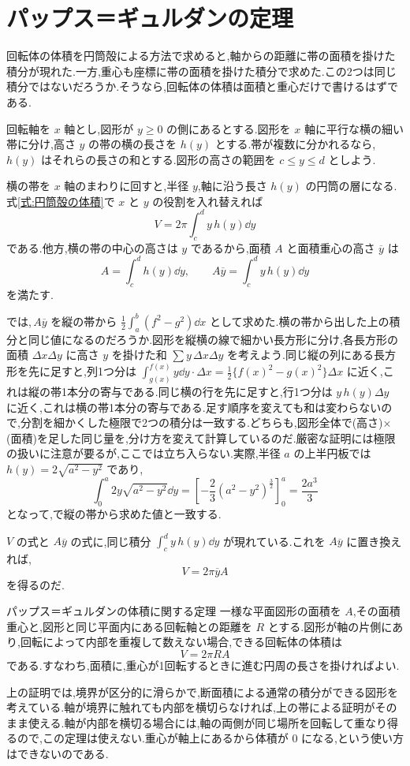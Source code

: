 \section{パップス＝ギュルダンの定理}\label{節:パップスの定理}

回転体の体積を円筒殻による方法で求めると,軸からの距離に帯の面積を掛けた積分が現れた.一方,重心も座標に帯の面積を掛けた積分で求めた.この2つは同じ積分ではないだろうか.そうなら,回転体の体積は面積と重心だけで書けるはずである.

回転軸を $x$ 軸とし,図形が $y\ge0$ の側にあるとする.図形を $x$ 軸に平行な横の細い帯に分け,高さ $y$ の帯の横の長さを $h(y)$ とする.帯が複数に分かれるなら,\,$h(y)$ はそれらの長さの和とする.図形の高さの範囲を $c\le y\le d$ としよう.

横の帯を $x$ 軸のまわりに回すと,半径 $y$,軸に沿う長さ $h(y)$ の円筒の層になる.式\eqref{式:円筒殻の体積}で $x$ と $y$ の役割を入れ替えれば
\[
V=2\pi\int_c^d y\,h(y)\dd y
\]
である.他方,横の帯の中心の高さは $y$ であるから,面積 $A$ と面積重心の高さ $\overline y$ は
\[
A=\int_c^d h(y)\dd y,\qquad
A\overline y=\int_c^d y\,h(y)\dd y
\]
を満たす.

では,\,$A\overline y$ を縦の帯から $\frac12\int_a^b(f^2-g^2)\dd x$ として求めた.横の帯から出した上の積分と同じ値になるのだろうか.図形を縦横の線で細かい長方形に分け,各長方形の面積 $\Delta x\Delta y$ に高さ $y$ を掛けた和 $\sum y\,\Delta x\Delta y$ を考えよう.同じ縦の列にある長方形を先に足すと,列1つ分は $\int_{g(x)}^{f(x)}y\dd y\cdot\Delta x=\frac12\{f(x)^2-g(x)^2\}\Delta x$ に近く,これは縦の帯1本分の寄与である.同じ横の行を先に足すと,行1つ分は $y\,h(y)\Delta y$ に近く,これは横の帯1本分の寄与である.足す順序を変えても和は変わらないので,分割を細かくした極限で2つの積分は一致する.どちらも,図形全体で(高さ)$\times$(面積)を足した同じ量を,分け方を変えて計算しているのだ.厳密な証明には極限の扱いに注意が要るが,ここでは立ち入らない.実際,半径 $a$ の上半円板では $h(y)=2\sqrt{a^2-y^2}$ であり,
\[
\int_0^a 2y\sqrt{a^2-y^2}\dd y
 =\left[-\frac23(a^2-y^2)^{\frac32}\right]_0^a
 =\frac{2a^3}{3}
\]
となって,で縦の帯から求めた値と一致する.

$V$ の式と $A\overline y$ の式に,同じ積分 $\int_c^d y\,h(y)\dd y$ が現れている.これを $A\overline y$ に置き換えれば,
\[
V=2\pi\overline yA
\]
を得るのだ.

\begin{theorem}{パップス＝ギュルダンの体積に関する定理}
一様な平面図形の面積を $A$,その面積重心と,図形と同じ平面内にある回転軸との距離を $R$ とする.図形が軸の片側にあり,回転によって内部を重複して数えない場合,できる回転体の体積は
\[
V=2\pi R A
\]
である.すなわち,面積に,重心が1回転するときに進む円周の長さを掛ければよい.
\end{theorem}

上の証明では,境界が区分的に滑らかで,断面積による通常の積分ができる図形を考えている.軸が境界に触れても内部を横切らなければ,上の帯による証明がそのまま使える.軸が内部を横切る場合には,軸の両側が同じ場所を回転して重なり得るので,この定理は使えない.重心が軸上にあるから体積が $0$ になる,という使い方はできないのである.

%
